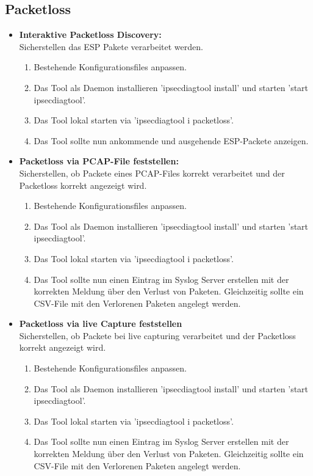 \subsection{Packetloss}
\begin{itemize}
\item[\Square] \textbf{Interaktive Packetloss Discovery:}\\
Sicherstellen das ESP Pakete verarbeitet werden.
\begin{enumerate} \itemsep1pt \parskip0pt 
  \item Bestehende Konfigurationsfiles anpassen.  
  \item Das Tool als Daemon installieren 'ipsecdiagtool install' und starten 'start ipsecdiagtool'.
  \item Das Tool lokal starten via 'ipsecdiagtool i packetloss'.
  \item Das Tool sollte nun ankommende und ausgehende ESP-Packete anzeigen.
\end{enumerate}

\item[\Square] \textbf{Packetloss via PCAP-File feststellen:}\\
Sicherstellen, ob Packete eines PCAP-Files korrekt verarbeitet und der Packetloss korrekt angezeigt wird.
\begin{enumerate} \itemsep1pt \parskip0pt 
  \item Bestehende Konfigurationsfiles anpassen.  
  \item Das Tool als Daemon installieren 'ipsecdiagtool install' und starten 'start ipsecdiagtool'.
  \item Das Tool lokal starten via 'ipsecdiagtool i packetloss'.
  \item Das Tool sollte nun einen Eintrag im Syslog Server erstellen mit der korrekten Meldung über den Verlust von Paketen. Gleichzeitig sollte ein CSV-File mit den Verlorenen Paketen angelegt werden.
\end{enumerate}

\item[\Square] \textbf{Packetloss via live Capture feststellen}\\
Sicherstellen, ob Packete bei live capturing verarbeitet und der Packetloss korrekt angezeigt wird.
\begin{enumerate} \itemsep1pt \parskip0pt 
  \item Bestehende Konfigurationsfiles anpassen.  
  \item Das Tool als Daemon installieren 'ipsecdiagtool install' und starten 'start ipsecdiagtool'.
  \item Das Tool lokal starten via 'ipsecdiagtool i packetloss'.
  \item Das Tool sollte nun einen Eintrag im Syslog Server erstellen mit der korrekten Meldung über den Verlust von Paketen. Gleichzeitig sollte ein CSV-File mit den Verlorenen Paketen angelegt werden.
\end{enumerate}

\end{itemize}